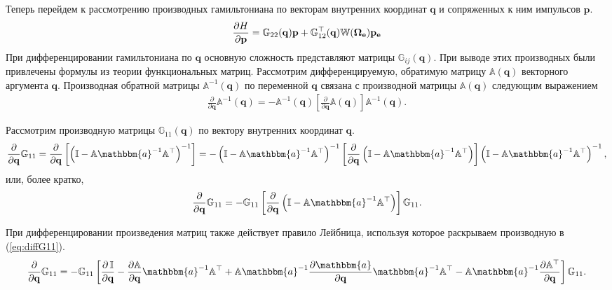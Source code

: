 \documentclass[12pt]{article}
\newcommand{\mf}{\mathbf}
\newcommand{\lb}{\left(}
\newcommand{\rb}{\right)}
\newcommand{\bbI}{\mathbb{I}}
\newcommand{\bba}{\mathbbm{a}}
\newcommand{\bbA}{\mathbb{A}}
\newcommand{\bbG}{\mathbb{G}}
\newcommand{\bbW}{\mathbb{W}}
\newcommand{\EOmega}{\boldsymbol{\Omega}_{\rm \textbf{e}}}
\newcommand{\pe}{\mf{p_e}}
\begin{document}
Теперь перейдем к рассмотрению производных гамильтониана по векторам внутренних координат $\mf{q}$ и сопряженных к ним импульсов $\mf{p}$.
\begin{gather}
	\frac{\partial H}{\partial \mf{p}} = \bbG_{22}(\mf{q}) \mf{p} + \bbG_{12}^\top (\mf{q}) \bbW(\EOmega) \pe
\end{gather}
При дифференцировании гамильтониана по $\mf{q}$ основную сложность представляют матрицы $\bbG_{ij}(\mf{q})$. При выводе этих производных были привлечены формулы из теории функциональных матриц.
Рассмотрим дифференцируемую, обратимую матрицу $\bbA(\mf{q})$ векторного аргумента $\mf{q}$. Производная обратной матрицы $\bbA^{-1}(\mf{q})$ по переменной $\mf{q}$ связана с производной матрицы $\bbA(\mf{q})$ следующим выражением 
\begin{gather}
		\frac{\partial}{\partial \mf{q}} \bbA^{-1}(\mf{q}) = -\bbA^{-1}(\mf{q})\left[ \frac{\partial}{\partial \mf{q}} \bbA(\mf{q}) \right] \bbA^{-1} (\mf{q}). 
\end{gather}

Рассмотрим производную матрицы $\bbG_{11}(\mf{q})$ по вектору внутренних координат $\mf{q}$. 
\begin{gather}
	\frac{\partial}{\partial \mf{q}} \bbG_{11} = \frac{\partial}{\partial \mf{q}} \left[ \lb \bbI - \bbA \bba^{-1} \bbA^\top \rb^{-1} \right] = - \lb \bbI - \bbA \bba^{-1} \bbA^\top \rb^{-1} \left[ \frac{\partial}{\partial \mf{q}} \lb \bbI - \bbA \bba^{-1} \bbA^\top \rb \right] \lb \bbI - \bbA \bba^{-1} \bbA^\top \rb^{-1}, 
\end{gather}
или, более кратко,
\begin{gather}
	\frac{\partial}{\partial \mf{q}} \bbG_{11} = - \bbG_{11} \left[ \frac{\partial}{\partial \mf{q}} \lb \bbI - \bbA \bba^{-1} \bbA^\top \rb \right] \bbG_{11}. \label{eq:diffG11}
\end{gather}

При дифференцировании произведения матриц также действует правило Лейбница, используя которое раскрываем производную в (\ref{eq:diffG11}).
\begin{gather}
	\frac{\partial}{\partial \mf{q}} \bbG_{11} = -\bbG_{11} \left[ \frac{\partial \, \bbI}{\partial \mf{q}} - \frac{\partial \bbA}{\partial \mf{q}} \bba^{-1} \bbA^\top + \bbA \bba^{-1} \frac{\partial \bba}{\partial \mf{q}} \bba^{-1} \bbA^\top - \bbA \bba^{-1} \frac{\partial \bbA^\top}{\partial \mf{q}} \right] \bbG_{11}. 
\end{gather}
\end{document}
